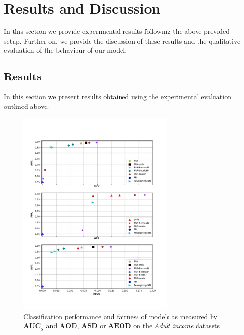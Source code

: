 \documentclass[preprint,12pt]{elsarticle}
\begin{document}
\section{Results and Discussion}
\label{sec:ResultsDiscussion}

In this section we provide experimental results following the above provided setup. Further on, we provide the discussion of these results and the qualitative evaluation of the behaviour of our model.

\subsection{Results}
\label{sec:Results}

In this section we present results obtained using the experimental evaluation outlined above.

\begin{figure}
	\center
	\includegraphics[angle=0, width=0.7\textwidth]{Adult.png}
	\captionsetup{justification=centering}
	\caption{Classification performance and fairness of models as measured by $\mathbf{AUC_y}$ and $\mathbf{AOD}$, $\mathbf{ASD}$ or $\mathbf{AEOD}$ on the \textit{Adult income} datasets}
	\label{fig:Adult}
	\vskip -0.2in
\end{figure}
\end{document}
